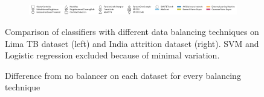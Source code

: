 \documentclass{sig-alternate-05-2015}
\begin{document}
\begin{figure}
\begin{subfigure}{.5\textwidth}
		\end{subfigure}
		\vspace*{-0.5cm}\hspace*{-3cm}\begin{subfigure}{\textwidth}
			\includegraphics[scale=0.5]{legend}
		\end{subfigure}	
		\caption{Comparison of classifiers with different data balancing techniques on Lima TB dataset (left) and India attrition dataset (right). SVM and Logistic regression excluded because of minimal variation.}
		\label{fig:classifier_vs_balancer}
	\end{figure}
	\begin{figure}
		\hspace*{-6em}
		\centering
		\caption{Difference from no balancer on each dataset for every balancing technique}
		\label{fig:balancing_per_dataset}
	\end{figure}
\end{document}
